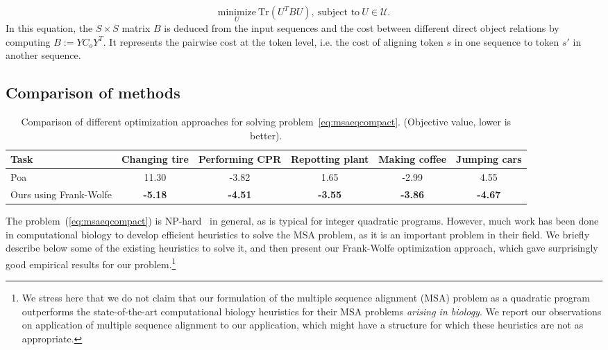 \documentclass[10pt,twocolumn,letterpaper]{article}
\newcommand{\Ctext}{C_o} %
\begin{document}
\begin{equation}
\underset{U}{\text{minimize}} \ \mathrm{Tr}(U^TBU), \ \text{subject to} \ U \in \mathcal{U}.
\label{eq:msaeqcompact}
\end{equation}
In this equation, the $S \times S$ matrix $B$ is deduced from the input sequences and the cost between different direct object relations by computing $B := Y \Ctext Y^T$.
It represents the pairwise cost at the token level, i.e. the cost of aligning token $s$ in one
sequence to token $s'$ in another sequence.
%
%

\subsection{Comparison of methods}
\label{subsec:comparison_msa}

\begin{table*}[!ht] 
    \centering
    \setlength{\tabcolsep}{.6em} 
    \begin{tabular}{lccccc} 
        \toprule
        Task 			&  Changing tire   &  Performing CPR  & Repotting plant &  Making coffee   & Jumping cars\\ 
        \midrule
%
        Poa~\cite{Lee01poa} 			    &   11.30   &   -3.82   &  1.65    &   -2.99   &   4.55	\\ 
        Ours using Frank-Wolfe 					    &  \textbf{-5.18}  &   \textbf{-4.51}   & \textbf{-3.55} &   \textbf{-3.86}   & \textbf{-4.67} 	\\ 
        \bottomrule
    \end{tabular}  
%
    \caption{Comparison of different optimization approaches for solving problem~\eqref{eq:msaeqcompact}. (Objective value, lower is better).}  
    \label{tab:msaObj}
%
\end{table*} 

The problem~(\ref{eq:msaeqcompact}) is NP-hard~\cite{wang1994msaNPhard} in general, as is typical 
for integer quadratic programs.
However, much work has been done in computational biology
to develop efficient heuristics to solve the MSA problem,
as it is an important problem in their field.
We briefly describe below some of the existing heuristics to solve it,
and then present our Frank-Wolfe optimization approach,
which gave surprisingly good empirical results
for our problem.\footnote{We stress here that we do not claim 
that our formulation of the multiple sequence alignment (MSA) problem as a quadratic program outperforms the state-of-the-art 
computational biology heuristics for their MSA problems \emph{arising in biology}.
We report our observations on application of multiple sequence alignment to our application,
which might have a structure for which these heuristics are not as appropriate.}
\end{document}
